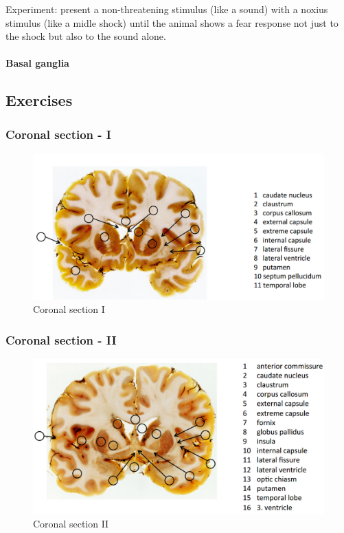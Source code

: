 \documentclass[12pt,article,oneside,a4paper]{memoir}
\begin{document}
Experiment: present a non-threatening stimulus (like a sound) with a noxius stimulus (like a midle shock) until the animal shows a fear response not just to the shock but also to the sound alone.

\paragraph{Basal ganglia}

\subsection{Exercises}

\subsubsection{Coronal section - I}
\begin{figure}[H]
	\centering
  	\includegraphics[width=\linewidth]{imgs/coronal-section-I.png}
	\caption{Coronal section I}
  	\label{fig:coronalSectionI}
\end{figure}

\subsubsection{Coronal section - II}
\begin{figure}[H]
	\centering
  	\includegraphics[width=\linewidth]{imgs/coronal-section-II.png}
	\caption{Coronal section II}
  	\label{fig:coronalSectionII}
\end{figure}
\end{document}
